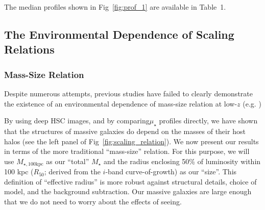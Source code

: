 \documentclass[a4paper,fleqn,usenatbib]{mnras}
\def\mstar{{$M_{\star}$}}
\def\mtot{{$M_{\star,100\mathrm{kpc}}$}}
\def\mden{{$\mu_{\star}$}}
\begin{document}
    The median profiles shown in Fig~\ref{fig:prof_1} are available in Table~1.

\subsection{The Environmental Dependence of Scaling Relations}
    \label{ssec:scaling}

\subsubsection{Mass-Size Relation}
    \label{sssec:mass_size}
        
    Despite numerous attempts, previous studies have failed to clearly 
    demonstrate the existence of an environmental dependence of mass-size relation
    at low-$z$ (e.g. \citealt{Weinmann2009, Nair2010, HCompany13, Cerbrian2014}) 
        
    
    By using deep HSC images, and by comparing\mden{} profiles directly, 
    we have shown that the structures of massive galaxies do depend on the masses of 
    their host halos (see the left panel of Fig~\ref{fig:scaling_relation}). 
    We now present our results in terms of the more traditional ``mass-size'' relation. 
    For this purpose, we will use \mtot{} as our ``total'' \mstar{} and the radius 
    enclosing 50\% of luminosity within 100 kpc ($R_{\mathrm{50}}$; derived from the 
    $i$-band curve-of-growth) as our ``size''. 
    This definition of ``effective radius'' is more robust against structural details, 
    choice of model, and the background subtraction. 
    Our massive galaxies are large enough that we do not need to worry about the 
    effects of seeing.
    
\end{document}

